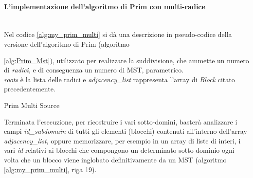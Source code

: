 \paragraph{L'implementazione dell'algoritmo di Prim con multi-radice}~\\
Nel codice \ref{alg:my_prim_multi} si dà una descrizione in pseudo-codice della versione dell'algoritmo di Prim (algoritmo {\ref{alg:Prim_Mst}), utilizzato per realizzare la suddivisione, che ammette un numero di \emph{radici}, e di conseguenza un numero di MST, parametrico.\\
\textit{roots} è la lista delle radici e \textit{adjacency\_list} rappresenta l'array di \textit{Block} citato precedentemente.
\begin{algorithm}[H]
	\caption{Prim Multi Source}
	\label{alg:my_prim_multi}
	\begin{algorithmic}[1]
		\Statex
		
		\State{\color{blue}{//Inizializzazione di tutti i vertici}}
		\EndFor
		
		\State{\color{blue}{//Inizializzazione di tutte le radici}}
		\EndFor
		
		
		\State{\color{blue}{//Essendo il minimo viene aggiunto definitivamente}}
		\State{\color{blue}{//Si analizzano i vicini}}
		\State{\color{blue}{//In questo caso specifico il peso di ogni arco vale 1}}
		\EndIf
		\EndFor
		\EndIf
		\EndWhile
		\State \Return{}
		\EndFunction
	\end{algorithmic}
\end{algorithm}
Terminata l'esecuzione, per ricostruire i vari sotto-domini, basterà analizzare i campi \textit{id\_subdomain} di tutti gli elementi (blocchi) contenuti all'interno dell'array \textit{adjacency\_list}, oppure memorizzare, per esempio in un array di liste di interi, i vari \textit{id} relativi ai blocchi che compongono un determinato sotto-dominio ogni volta che un blocco viene inglobato definitivamente da un MST (algoritmo \ref{alg:my_prim_multi}, riga 19).

}
